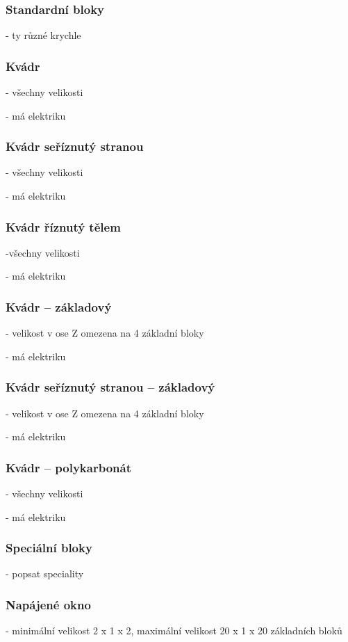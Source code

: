 \subsubsection{Standardní bloky}
- ty různé krychle

\subsubsection{Kvádr}
- všechny velikosti

- má elektriku

\subsubsection{Kvádr seříznutý stranou}
- všechny velikosti

- má elektriku

\subsubsection{Kvádr říznutý tělem}
-všechny velikosti

- má elektriku

\subsubsection{Kvádr -- základový}
- velikost v ose Z omezena na 4 základní bloky

- má elektriku

\subsubsection{Kvádr seříznutý stranou -- základový}
- velikost v ose Z omezena na 4 základní bloky

- má elektriku

\subsubsection{Kvádr -- polykarbonát}
- všechny velikosti

- má elektriku


\subsubsection{Speciální bloky}
- popsat speciality

\subsubsection{Napájené okno}
- minimální velikost 2 x 1 x 2, maximální velikost 20 x 1 x 20 základních bloků

